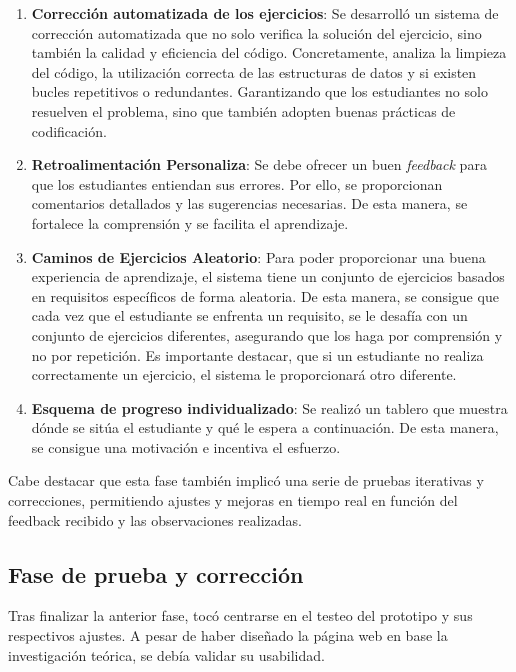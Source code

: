 \begin{enumerate}
    \item \textbf{Corrección automatizada de los ejercicios}: Se desarrolló un sistema de corrección automatizada que no solo verifica la solución del ejercicio, sino también la calidad y eficiencia del código. Concretamente, analiza la limpieza del código, la utilización correcta de las estructuras de datos y si existen bucles repetitivos o redundantes. Garantizando que los estudiantes no solo resuelven el problema, sino que también adopten buenas prácticas de codificación.

    \item \textbf{Retroalimentación Personaliza}: Se debe ofrecer un buen \textit{feedback} para que los estudiantes entiendan sus errores. Por ello, se proporcionan comentarios detallados y las sugerencias necesarias. De esta manera, se fortalece la comprensión y se facilita el aprendizaje.

    \item \textbf{Caminos de Ejercicios Aleatorio}: Para poder proporcionar una buena experiencia de aprendizaje, el sistema tiene un conjunto de ejercicios basados en requisitos específicos de forma aleatoria. De esta manera, se consigue que cada vez que el estudiante se enfrenta un requisito, se le desafía con un conjunto de ejercicios diferentes, asegurando que los haga por comprensión y no por repetición. Es importante destacar, que si un estudiante no realiza correctamente un ejercicio, el sistema le proporcionará otro diferente.
    
    \item \textbf{Esquema de progreso individualizado}: Se realizó un tablero que muestra dónde se sitúa el estudiante y qué le espera a continuación. De esta manera, se consigue una motivación e incentiva el esfuerzo.
\end{enumerate}

Cabe destacar que esta fase también implicó una serie de pruebas iterativas y correcciones, permitiendo ajustes y mejoras en tiempo real en función del feedback recibido y las observaciones realizadas.

\subsection{Fase de prueba y corrección}

Tras finalizar la anterior fase, tocó centrarse en el testeo del prototipo y sus respectivos ajustes. A pesar de haber diseñado la página web en base la investigación teórica, se debía validar su usabilidad.


